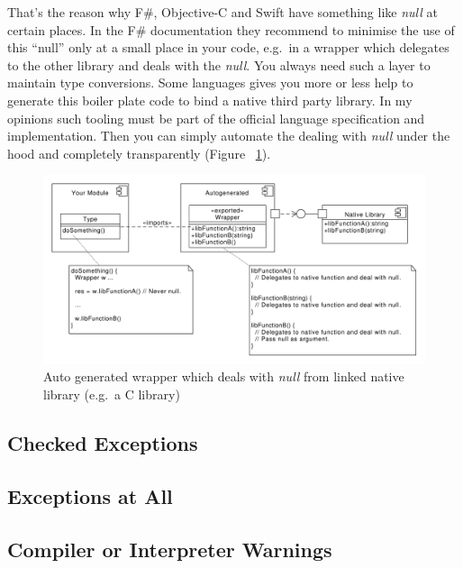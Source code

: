 \documentclass[11pt, a4paper]{report}
\begin{document}
That's the reason why F\#, Objective-C and Swift have something like \textit{null} at certain places. In the F\# documentation they recommend to minimise the use of this ``null'' only at a small place in your code, e.g.\ in a wrapper which delegates to the other library and deals with the \textit{null}. You always need such a layer to maintain type conversions. Some languages gives you more or less help to generate this boiler plate code to bind a native third party library. In my opinions such tooling must be part of the official language specification and implementation. Then you can simply automate the dealing with \textit{null} under the hood and completely transparently (Figure
 ~\ref{fig:Generated_wrapper_for_linked_native_libs}).

\begin{figure}[ht]
    \centering
    \includegraphics[width=350pt]{grafics/Generated_wrapper_for_linked_native_libs.pdf}
    \caption{Auto generated wrapper which deals with \textit{null} from linked native library (e.g.\ a C library)}
    \label{fig:Generated_wrapper_for_linked_native_libs}
\end{figure}

\subsection{Checked Exceptions}


\subsection{Exceptions at All}


\subsection{Compiler or Interpreter Warnings}
\end{document}
